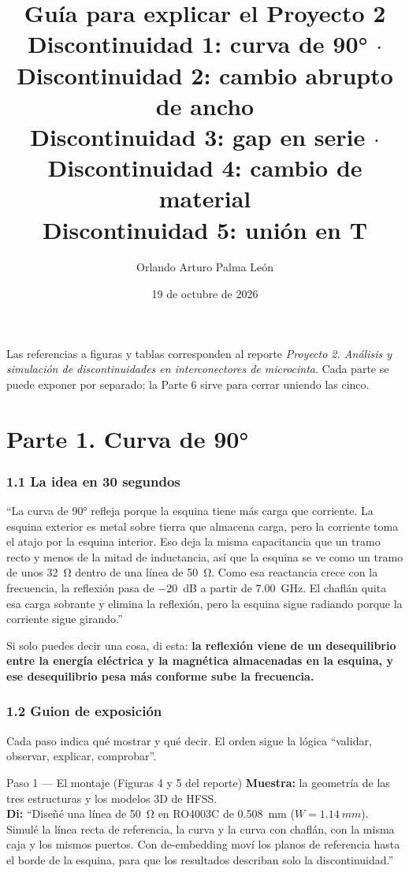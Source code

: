\documentclass[11pt,letterpaper]{article}
\title{\textbf{Guía para explicar el Proyecto 2}\\[4pt]\large Discontinuidad 1: curva de \ang{90} $\cdot$ Discontinuidad 2: cambio abrupto de ancho\\ Discontinuidad 3: gap en serie $\cdot$ Discontinuidad 4: cambio de material\\ Discontinuidad 5: unión en T}
\author{Orlando Arturo Palma León}
\date{19 de octubre de 2026}
\begin{document}
\maketitle

Las referencias a figuras y tablas corresponden al reporte \emph{Proyecto 2. Análisis y simulación de discontinuidades en interconectores de microcinta}. Cada parte se puede exponer por separado; la Parte 6 sirve para cerrar uniendo las cinco.

\part*{Parte 1. Curva de \ang{90}}

\section*{1.1 La idea en 30 segundos}
\begin{idea}
``La curva de \ang{90} refleja porque la esquina tiene más carga que corriente. La esquina exterior es metal sobre tierra que almacena carga, pero la corriente toma el atajo por la esquina interior. Eso deja la misma capacitancia que un tramo recto y menos de la mitad de inductancia, así que la esquina se ve como un tramo de unos \SI{32}{\ohm} dentro de una línea de \SI{50}{\ohm}. Como esa reactancia crece con la frecuencia, la reflexión pasa de $-20$~dB a partir de \SI{7.00}{GHz}. El chaflán quita esa carga sobrante y elimina la reflexión, pero la esquina sigue radiando porque la corriente sigue girando.''
\end{idea}

Si solo puedes decir una cosa, di esta: \textbf{la reflexión viene de un desequilibrio entre la energía eléctrica y la magnética almacenadas en la esquina, y ese desequilibrio pesa más conforme sube la frecuencia.}

\section*{1.2 Guion de exposición}
Cada paso indica qué mostrar y qué decir. El orden sigue la lógica ``validar, observar, explicar, comprobar''.

\begin{paso}{Paso 1 --- El montaje (Figuras 4 y 5 del reporte)}
\textbf{Muestra:} la geometría de las tres estructuras y los modelos 3D de HFSS.\\
\textbf{Di:} ``Diseñé una línea de \SI{50}{\ohm} en RO4003C de \SI{0.508}{mm} ($W=\SI{1.14}{mm}$). Simulé la línea recta de referencia, la curva y la curva con chaflán, con la misma caja y los mismos puertos. Con de-embedding moví los planos de referencia hasta el borde de la esquina, para que los resultados describan solo la discontinuidad.''
\end{paso}
\end{document}
